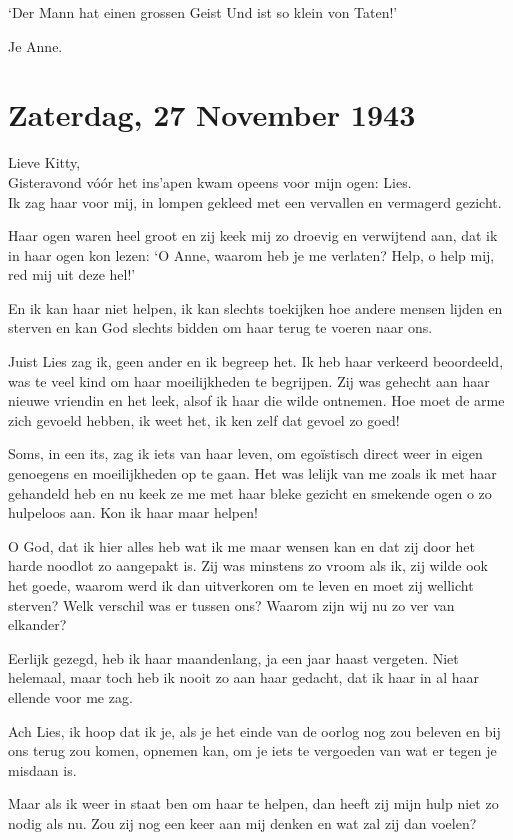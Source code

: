 \documentclass{book}
\begin{document}
`Der Mann hat einen grossen Geist Und ist so klein von Taten!'

Je Anne.

\chapter{Zaterdag, 27 November 1943}

Lieve Kitty,\\Gisteravond vóór het ins'apen kwam opeens voor mijn ogen:
Lies.\\Ik zag haar voor mij, in lompen gekleed met een vervallen en
vermagerd gezicht.

Haar ogen waren heel groot en zij keek mij zo droevig en verwijtend aan,
dat ik in haar ogen kon lezen: `O Anne, waarom heb je me verlaten? Help,
o help mij, red mij uit deze hel!'

En ik kan haar niet helpen, ik kan slechts toekijken hoe andere mensen
lijden en sterven en kan God slechts bidden om haar terug te voeren naar
ons.

Juist Lies zag ik, geen ander en ik begreep het. Ik heb haar verkeerd
beoordeeld, was te veel kind om haar moeilijkheden te begrijpen. Zij was
gehecht aan haar nieuwe vriendin en het leek, alsof ik haar die wilde
ontnemen. Hoe moet de arme zich gevoeld hebben, ik weet het, ik ken zelf
dat gevoel zo goed!

Soms, in een its, zag ik iets van haar leven, om egoïstisch direct weer
in eigen genoegens en moeilijkheden op te gaan. Het was lelijk van me
zoals ik met haar gehandeld heb en nu keek ze me met haar bleke gezicht
en smekende ogen o zo hulpeloos aan. Kon ik haar maar helpen!

O God, dat ik hier alles heb wat ik me maar wensen kan en dat zij door
het harde noodlot zo aangepakt is. Zij was minstens zo vroom als ik, zij
wilde ook het goede, waarom werd ik dan uitverkoren om te leven en moet
zij wellicht sterven? Welk verschil was er tussen ons? Waarom zijn wij
nu zo ver van elkander?

Eerlijk gezegd, heb ik haar maandenlang, ja een jaar haast vergeten.
Niet helemaal, maar toch heb ik nooit zo aan haar gedacht, dat ik haar
in al haar ellende voor me zag.

Ach Lies, ik hoop dat ik je, als je het einde van de oorlog nog zou
beleven en bij ons terug zou komen, opnemen kan, om je iets te vergoeden
van wat er tegen je misdaan is.

Maar als ik weer in staat ben om haar te helpen, dan heeft zij mijn hulp
niet zo nodig als nu. Zou zij nog een keer aan mij denken en wat zal zij
dan voelen?
\end{document}
